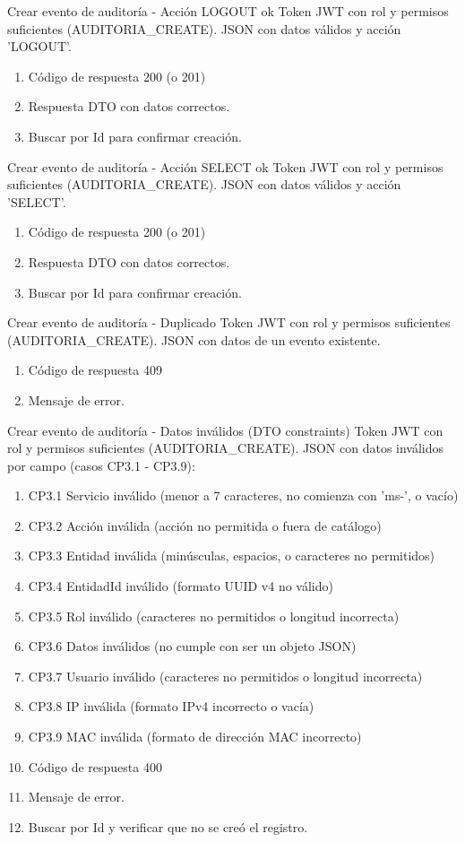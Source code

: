 {Crear evento de auditoría - Acción LOGOUT ok}
{Token JWT con rol y permisos suficientes (AUDITORIA\_CREATE).}
{JSON con datos válidos y acción 'LOGOUT'.}
{\begin{enumerate} [leftmargin=*, nosep]
    \item Código de respuesta 200 (o 201)
    \item Respuesta DTO con datos correctos.
    \item Buscar por Id para confirmar creación.
\end{enumerate}}

{Crear evento de auditoría - Acción SELECT ok}
{Token JWT con rol y permisos suficientes (AUDITORIA\_CREATE).}
{JSON con datos válidos y acción 'SELECT'.}
{\begin{enumerate} [leftmargin=*, nosep]
    \item Código de respuesta 200 (o 201)
    \item Respuesta DTO con datos correctos.
    \item Buscar por Id para confirmar creación.
\end{enumerate}}

{Crear evento de auditoría - Duplicado}
{Token JWT con rol y permisos suficientes (AUDITORIA\_CREATE).}
{JSON con datos de un evento existente.}
{\begin{enumerate} [leftmargin=*, nosep]
    \item Código de respuesta 409
    \item Mensaje de error.
\end{enumerate}}

{Crear evento de auditoría - Datos inválidos (DTO constraints)}
{Token JWT con rol y permisos suficientes (AUDITORIA\_CREATE).}
{JSON con datos inválidos por campo (casos CP3.1 - CP3.9):}
{\begin{enumerate} [leftmargin=*, nosep]
    \item CP3.1 Servicio inválido (menor a 7 caracteres, no comienza con 'ms-', o vacío)
    \item CP3.2 Acción inválida (acción no permitida o fuera de catálogo)
    \item CP3.3 Entidad inválida (minúsculas, espacios, o caracteres no permitidos)
    \item CP3.4 EntidadId inválido (formato UUID v4 no válido)
    \item CP3.5 Rol inválido (caracteres no permitidos o longitud incorrecta)
    \item CP3.6 Datos inválidos (no cumple con ser un objeto JSON)
    \item CP3.7 Usuario inválido (caracteres no permitidos o longitud incorrecta)
    \item CP3.8 IP inválida (formato IPv4 incorrecto o vacía)
    \item CP3.9 MAC inválida (formato de dirección MAC incorrecto)
    \item Código de respuesta 400
    \item Mensaje de error.
    \item Buscar por Id y verificar que no se creó el registro.
\end{enumerate}}

